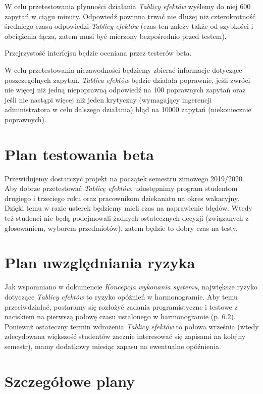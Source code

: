 \documentclass{article}
\begin{document}
W celu przetestowania płynności działania \textit{Tablicy efektów} wyślemy do niej 600 zapytań w ciągu minuty.
Odpowiedź powinna trwać nie dłużej niż czterokrotność średniego czasu odpowiedzi \textit{Tablicy efektów} (czas ten zależy także od szybkości i obciążenia łącza, zatem musi być mierzony bezpośrednio przed testem).

Przejrzystość interfejsu będzie oceniana przez testerów beta.

W celu przetestowania niezawodności będziemy zbierać informacje dotyczące poszczególnych zapytań.
\textit{Tablica efektów} będzie działała poprawnie, jeśli zwróci nie więcej niż jedną niepoprawną odpowiedź na 100 poprawnych zapytań oraz jeśli nie nastąpi więcej niż jeden krytyczny (wymagający ingerencji administratora w celu dalszego działania) błąd na 10000 zapytań (niekoniecznie poprawnych).

\newpage

\section{Plan testowania beta}
Przewidujemy dostarczyć projekt na początek semestru zimowego 2019/2020.
Aby dobrze przetestować \textit{Tablicę efektów}, udostępnimy program studentom drugiego i trzeciego roku oraz pracownikom dziekanatu na okres wakacyjny.
Dzięki temu w razie usterek będziemy mieli czas na naprawienie błędów.
Wtedy też studenci nie będą podejmowali żadnych ostatecznych decyzji (związanych z głosowaniem, wyborem przedmiotów), zatem będzie to dobry czas na testy.

\section{Plan uwzględniania ryzyka}
Jak wspomniano w dokumencie \textit{Koncepcja wykonania systemu}, największe ryzyko dotyczące \textit{Tablicy efektów} to ryzyko opóźnień w harmonogramie.
Aby temu przeciwdziałać, postaramy się rozłożyć zadania programistyczne i testowe z naciskiem na pierwszą połowę czasu ustalonego w harmonogramie (p. 6.2).
Ponieważ ostateczny termin wdrożenia \textit{Tablicy efektów} to połowa września (wtedy zdecydowana większość studentów zacznie interesować się zapisami na kolejny semestr), mamy dodatkowy miesiąc zapasu na ewentualne opóźnienia.

\section{Szczegółowe plany}
\end{document}
